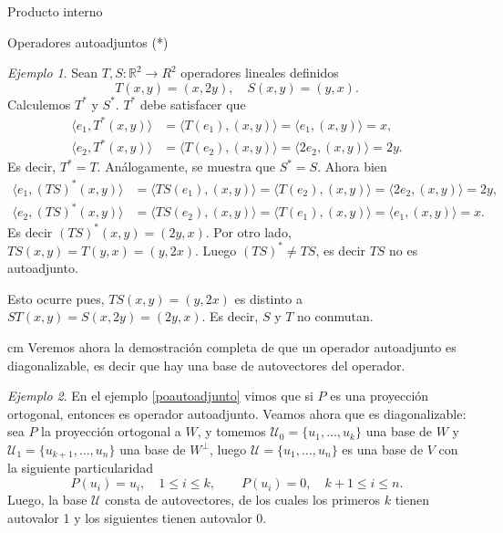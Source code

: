 \documentclass[a4paper,12pt,twoside,spanish,reqno]{amsbook}
\numberwithin{equation}{section}
\theoremstyle{definition}
\theoremstyle{remark}
\newtheorem*{ejemplo*}{Ejemplo}
\newcommand{\la}{\langle}
\newcommand{\ra}{\rangle}
\newcommand{\R}{\mathbb R}
\begin{document}
\begin{chapter}{Producto interno}
\begin{section}{Operadores autoadjuntos (*)}
        
        \begin{ejemplo*}
            Sean $T,S: \R^2 \to R^2$ operadores lineales definidos
            $$
            T(x,y) = (x,2y),\quad S(x,y) = (y,x).
            $$
            Calculemos $T^*$ y $S^*$. $T^*$ debe satisfacer  que 
            \begin{align*}
                \la e_1, T^*(x,y)\ra &= \la T(e_1),(x,y) \ra = \la e_1, (x,y) \ra = x, \\
                \la e_2, T^*(x,y)\ra &= \la T(e_2),(x,y) \ra = \la 2e_2, (x,y) \ra = 2y.
            \end{align*}
            Es decir, $T^* = T$. Análogamente, se muestra que $S^* = S$. Ahora bien
            \begin{align*}
            \la e_1, (TS)^*(x,y)\ra &= \la TS(e_1),(x,y) \ra = \la T(e_2), (x,y) \ra = \la 2e_2, (x,y) \ra = 2y, \\
            \la e_2, (TS)^*(x,y)\ra &= \la TS(e_2),(x,y) \ra = \la T(e_1), (x,y) \ra = \la e_1, (x,y) \ra = x.
            \end{align*}
            Es decir $(TS)^*(x,y) = (2y,x)$. Por otro lado,  $TS(x,y) = T(y,x) = (y,2x)$. Luego $(TS)^* \ne TS$, es decir $TS$ no es autoadjunto. 
            
            Esto ocurre pues, $TS(x,y) = (y,2x)$ es distinto a  $ST(x,y) = S(x,2y)= (2y,x)$. Es decir, $S$ y $T$ no conmutan.
        \end{ejemplo*}
        
        
         cm
        Veremos ahora la demostración completa de que un operador autoadjunto es diagonalizable, es decir que hay una base de autovectores del operador. 
        
        \begin{ejemplo*}
            En el ejemplo \ref{poautoadjunto} vimos que si  $P$ es una proyección ortogonal, entonces es  operador autoadjunto. Veamos ahora que es diagonalizable: sea $P$ la proyección ortogonal a $W$, y tomemos $\mathcal{U}_0 = \{u_1,\ldots,u_k\}$ una base de $W$ y  $\mathcal{U}_1 = \{u_{k+1},\ldots,u_n\}$ una base de $W^\perp$, luego $\mathcal{U} = \{u_1,\ldots,u_n\}$ es una base de $V$ con la siguiente particularidad
            $$
            P(u_i) = u_i,\quad 1 \le i \le k, \qquad P(u_i) = 0,\quad k+1 \le i \le n.
            $$
            Luego, la base $\mathcal{U}$ consta de autovectores, de los  cuales los primeros $k$ tienen autovalor 1 y los siguientes tienen autovalor 0.
        \end{ejemplo*}
        

\end{section}
\end{chapter}
\end{document}
